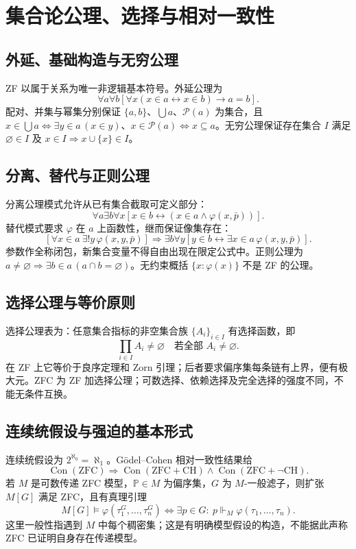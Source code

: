 \documentclass[../main.tex]{subfiles}
\begin{document}
\section{集合论公理、选择与相对一致性}
\subsection{外延、基础构造与无穷公理}
ZF 以属于关系为唯一非逻辑基本符号。外延公理为
\[
\forall a\forall b[\forall x(x\in a\leftrightarrow x\in b)\to a=b].
\]
配对、并集与幂集分别保证 $\{a,b\}$、$\bigcup a$、$\mathcal P(a)$ 为集合，且 $x\in\bigcup a\iff\exists y\in a\,(x\in y)$、$x\in\mathcal P(a)\iff x\subseteq a$。无穷公理保证存在集合 $I$ 满足 $\varnothing\in I$ 及 $x\in I\Rightarrow x\cup\{x\}\in I$。
\subsection{分离、替代与正则公理}
分离公理模式允许从已有集合截取可定义部分：
\[
\forall a\exists b\forall x[x\in b\leftrightarrow(x\in a\land\varphi(x,\bar p))].
\]
替代模式要求 $\varphi$ 在 $a$ 上函数性，继而保证像集存在：
\[
[\forall x\in a\ \exists!y\,\varphi(x,y,\bar p)]
\Rightarrow\exists b\forall y[y\in b\leftrightarrow\exists x\in a\,\varphi(x,y,\bar p)].
\]
参数作全称闭包，新集合变量不得自由出现在限定公式中。正则公理为 $a\ne\varnothing\Rightarrow\exists b\in a\,(a\cap b=\varnothing)$。无约束概括 $\{x:\varphi(x)\}$ 不是 ZF 的公理。
\subsection{选择公理与等价原则}
选择公理表为：任意集合指标的非空集合族 $\{A_i\}_{i\in I}$ 有选择函数，即
\[
\prod_{i\in I}A_i\ne\varnothing\quad\text{若全部 }A_i\ne\varnothing.
\]
在 ZF 上它等价于良序定理和 Zorn 引理；后者要求偏序集每条链有上界，便有极大元。ZFC 为 ZF 加选择公理；可数选择、依赖选择及完全选择的强度不同，不能无条件互换。
\subsection{连续统假设与强迫的基本形式}
连续统假设为 $2^{\aleph_0}=\aleph_1$。Gödel--Cohen 相对一致性结果给
\[
\operatorname{Con}(\mathrm{ZFC})\Rightarrow
\operatorname{Con}(\mathrm{ZFC}+\mathrm{CH})\land\operatorname{Con}(\mathrm{ZFC}+\neg\mathrm{CH}).
\]
若 $M$ 是可数传递 ZFC 模型，$\mathbb P\in M$ 为偏序集，$G$ 为 $M$-一般滤子，则扩张 $M[G]$ 满足 ZFC，且有真理引理
\[
M[G]\models\varphi(\tau_1^G,\ldots,\tau_n^G)
\iff\exists p\in G:\ p\Vdash_M\varphi(\tau_1,\ldots,\tau_n).
\]
这里一般性指遇到 $M$ 中每个稠密集；这是有明确模型假设的构造，不能据此声称 ZFC 已证明自身存在传递模型。
\end{document}
